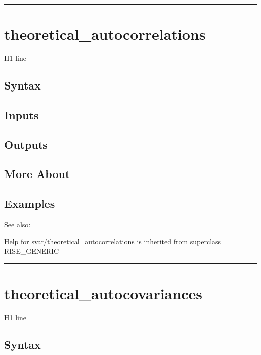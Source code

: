 \documentclass[letterpaper,10pt,english]{sphinxmanual}
\begin{document}
\bigskip\hrule{}\bigskip



\section{theoretical\_autocorrelations}
\label{classes/models/@svar/svar:theoretical-autocorrelations}\label{classes/models/@svar/svar:id159}
H1 line


\subsection{Syntax}
\label{classes/models/@svar/svar:id160}

\subsection{Inputs}
\label{classes/models/@svar/svar:id161}

\subsection{Outputs}
\label{classes/models/@svar/svar:id162}

\subsection{More About}
\label{classes/models/@svar/svar:id163}

\subsection{Examples}
\label{classes/models/@svar/svar:id164}
See also:

Help for svar/theoretical\_autocorrelations is inherited from superclass RISE\_GENERIC


\bigskip\hrule{}\bigskip



\section{theoretical\_autocovariances}
\label{classes/models/@svar/svar:theoretical-autocovariances}\label{classes/models/@svar/svar:id165}
H1 line


\subsection{Syntax}
\label{classes/models/@svar/svar:id166}
\end{document}
